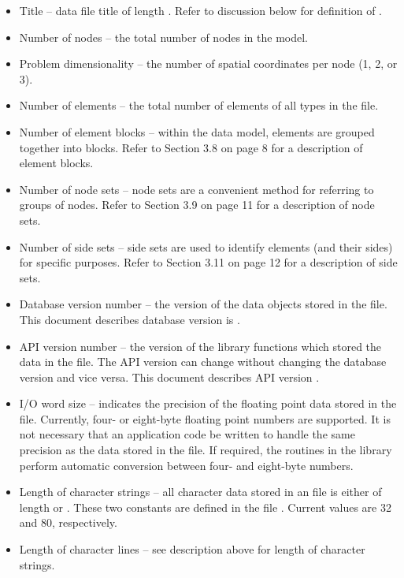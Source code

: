 \begin{itemize}
 \item {Title -- data file title of length}
 . Refer to discussion below for definition
 of .

 \item {Number of nodes -- the total number of nodes in the model.}

 \item {Problem dimensionality -- the number of spatial coordinates
 per node (1, 2, or 3).}

 \item {Number of elements -- the total number of elements of all
 types in the file.}

 \item {Number of element blocks -- within the \exo{} data model,
 elements are grouped together into blocks. Refer to Section 3.8 on
 page 8 for a description of element blocks. }

 \item {Number of node sets -- node sets are a convenient method for
 referring to groups of nodes. Refer to Section 3.9 on page 11 for a
 description of node sets.}

 \item {Number of side sets -- side sets are used to identify elements
 (and their sides) for specific purposes. Refer to Section 3.11 on
 page 12 for a description of side sets.}

 \item Database version number -- the version of the data objects
 stored in the file. This document describes database version is
 \version{}.

 \item API version number -- the version of the \exo{} library
 functions which stored the data in the file. The API version can
 change without changing the database version and vice versa. This
 document describes API version \version{}.

 \item {I/O word size -- indicates the precision of the floating point
 data stored in the file. Currently, four- or eight-byte floating
 point numbers are supported. It is not necessary that an application
 code be written to handle the same precision as the data stored in
 the file. If required, the routines in the \exo{} library perform
 automatic conversion between four- and eight-byte numbers.}

 \item Length of character strings -- all character data stored in an
 \exo{} file is either of length  or
 . These two constants are defined in the
 file . Current values are 32 and
 80, respectively.

 \item Length of character lines -- see description above 
for length of character strings.
\end{itemize}


